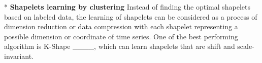  
\/*
\textbf{Shapelets learning by clustering}
Instead of finding the optimal shapelets based on labeled data, the learning of shapelets can be considered as a process of dimension reduction or data compression with each shapelet representing a possible dimension or coordinate of time series. 
One of the best performing algorithm is K-Shape ____, which can learn shapelets that are shift and scale-invariant.
